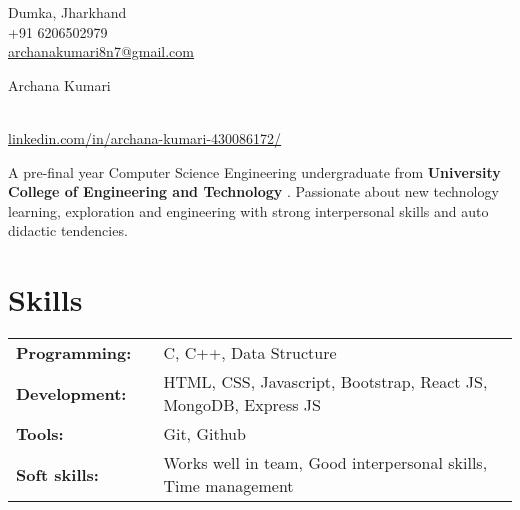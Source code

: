 \documentclass[a4,10pt]{article}
\newcommand{\hskills}[1]{
\textbf{\bfseries #1} }
\begin{document}
\begin{center}
    \begin{minipage}[b]{0.24\textwidth}
            \large Dumka, Jharkhand \\
            \large +91 6206502979 \\
            \large \href{archanakumari8n7@gmail.com}{archanakumari8n7@gmail.com} 
    \end{minipage}%
    \begin{minipage}[b]{0.5\textwidth}
            \centering
            {\HUGE Archana Kumari} \\ %
            \vspace{0.1cm}
            {\color{UI_blue} \Large{}} \\
    \end{minipage}%
    \begin{minipage}[b]{0.24\textwidth}
            \flushright \large  %
            {\href{https://www.linkedin.com/in/archana-kumari-430086172/}{linkedin.com/in/archana-kumari-430086172/} } \\
    \end{minipage}   
    
\vspace{-0.15cm} 
{\color{UI_blue} \hrulefill}
\end{center}
\vspace{-0.2cm}
A pre-final year Computer Science Engineering undergraduate from \hskills{University College of Engineering and Technology}. Passionate about new technology learning, exploration and engineering with strong interpersonal skills and auto didactic tendencies.  
\vspace{-0.2cm}







\section{Skills}
\begin{tabular}{p{11em} p{1em} p{43em}}
\hskills{Programming:}&  &  C, C++, Data Structure \\
\hskills{Development:} &  & HTML, CSS, Javascript, Bootstrap, React JS, MongoDB, Express JS \\
\hskills{Tools:} &  & Git, Github \\
\hskills{Soft skills:} &  & Works well in team, Good interpersonal skills, Time management \\
\end{tabular}
\vspace{-0.2cm}
\end{document}
